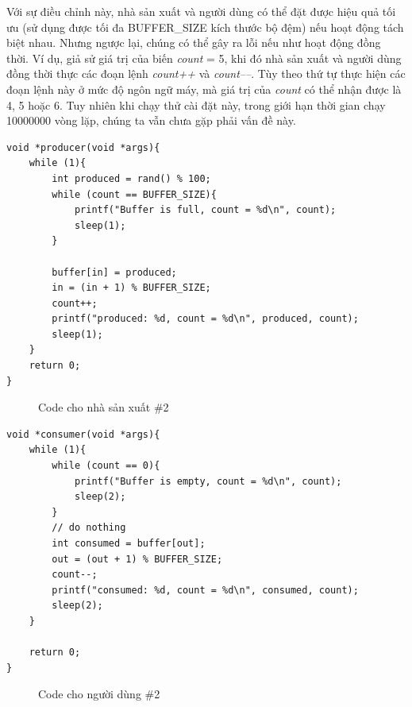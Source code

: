\documentclass{article}
\begin{document}
Với sự điều chỉnh này, nhà sản xuất và người dùng có thể  đặt được hiệu quả tối ưu (sử dụng được tối đa BUFFER\_SIZE kích thước bộ đệm)
nếu hoạt động tách biệt nhau. Nhưng ngược lại, chúng có thể  gây ra lỗi nếu như hoạt động
đồng thời. Ví dụ, giả sử giá trị của biến \textit{count} = 5, khi đó nhà sản xuất
và người dùng đồng thời thực các đoạn lệnh \textit{count++} và \textit{count\---\---}.
Tùy theo thứ tự thực hiện các đoạn lệnh này ở mức độ ngôn ngữ máy, mà giá trị của
\textit{count} có thể nhận được là 4, 5 hoặc 6. Tuy nhiên khi chạy thử cài đặt này, trong
giới hạn thời gian chạy 10000000 vòng lặp, chúng ta vẫn chưa gặp phải vấn đề này.

\pagebreak

\begin{shaded}
    \begin{lstlisting}
void *producer(void *args){
    while (1){
        int produced = rand() % 100;
        while (count == BUFFER_SIZE){
            printf("Buffer is full, count = %d\n", count);
            sleep(1);
        }

        buffer[in] = produced;
        in = (in + 1) % BUFFER_SIZE;
        count++;
        printf("produced: %d, count = %d\n", produced, count);
        sleep(1);
    }
    return 0;
}
    \end{lstlisting}
\end{shaded}

\begin{figure}[h]
    \centering
    \caption{Code cho nhà sản xuất \#2}
\end{figure}

\begin{shaded}
    \begin{lstlisting}
void *consumer(void *args){
    while (1){
        while (count == 0){
            printf("Buffer is empty, count = %d\n", count);
            sleep(2);
        }
        // do nothing
        int consumed = buffer[out];
        out = (out + 1) % BUFFER_SIZE;
        count--;
        printf("consumed: %d, count = %d\n", consumed, count);
        sleep(2);
    }

    return 0;
}
    \end{lstlisting}
\end{shaded}

\begin{figure}[h]
    \centering
    \caption{Code cho người dùng \#2}
\end{figure}
\end{document}
